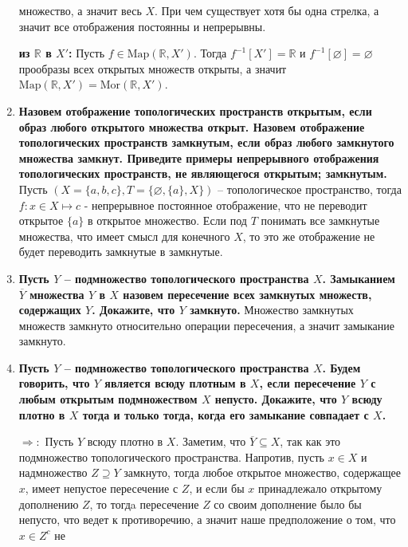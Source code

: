 \documentclass{article}
\begin{document}
\begin{enumerate}
        множество, а значит весь $X$. При чем существует хотя бы одна стрелка,
        а значит все отображения постоянны и непрерывны.\par
        \textbf{из $\mathbb{R}$ в $X'$:} Пусть $f\in\text{Map}(\mathbb{R}, X')$.
        Тогда $f^{-1}[X'] = \mathbb{R}$ и $f^{-1}[\varnothing]=\varnothing$
        прообразы всех открытых множеств открыты, а значит $\text{Map}(
        \mathbb{R}, X')=\text{Mor}(\mathbb{R}, X')$.
    \item \textbf{Назовем отображение топологических пространств открытым,
        если образ любого открытого множества открыт. Назовем отображение
        топологических пространств замкнутым, если образ любого
        замкнутого множества замкнут. Приведите примеры непрерывного
        отображения топологических пространств, не являющегося открытым;
        замкнутым.} Пусть $(X = \{a,b,c\}, T = \{\varnothing, \{a\}, X\})$ –
        топологическое пространство, тогда $f:x\in X\mapsto c$ - непрерывное 
        постоянное отображение, что не переводит открытое $\{a\}$ в открытое
        множество. Если под $T$ понимать все замкнутые множества, что имеет
        смысл для конечного $X$, то это же отображение не будет переводить
        замкнутые в замкнутые.
    \item \textbf{Пусть $Y$ – подмножество топологического пространства $X$.
        Замыканием $\overline{Y}$ множества $Y$ в $X$ назовем пересечение всех
        замкнутых множеств, содержащих $Y$. Докажите, что $Y$ замкнуто.}
        Множество замкнутых множеств замкнуто относительно операции
        пересечения, а значит замыкание замкнуто.
    \item \textbf{Пусть $Y$ – подмножество топологического пространства $X$.
        Будем говорить, что $Y$ является всюду плотным в $X$, если
        пересечение $Y$ с любым открытым подмножеством $X$ непусто. Докажите,
        что $Y$ всюду плотно в $X$ тогда и только тогда, когда его замыкание
        совпадает с $X$.}\par
        $\Rightarrow:$ Пусть $Y$ всюду плотно в $X$. Заметим, что $\overline{Y}
        \subseteq X$, так как это подмножество топологического пространства.
        Напротив, пусть $x\in X$ и надмножество $Z\supseteq Y$ замкнуто, тогда
        любое открытое множество, содержащее $x$, имеет непустое пересечение с
        $Z$, и если бы $x$ принадлежало открытому дополнению $Z$, то тогдa
        пересечение $Z$ со своим дополнение было бы непусто, что ведет к
        противоречию, а значит наше предположение о том, что $x\in Z^c$ не

\end{enumerate}
\end{document}
